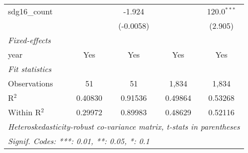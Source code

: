 \begin{tabular}{lcccc}
   sdg16\_count      &                & -1.924         &                & 120.0$^{***}$\\   
                     &                & (-0.0058)      &                & (2.905)\\   
   \midrule
   \emph{Fixed-effects}\\
   year              & Yes            & Yes            & Yes            & Yes\\  
   \midrule
   \emph{Fit statistics}\\
   Observations      & 51             & 51             & 1,834          & 1,834\\  
   R$^2$             & 0.40830        & 0.91536        & 0.49864        & 0.53268\\  
   Within R$^2$      & 0.29972        & 0.89983        & 0.48629        & 0.52116\\  
   \midrule \midrule
   \multicolumn{5}{l}{\emph{Heteroskedasticity-robust co-variance matrix, t-stats in parentheses}}\\
   \multicolumn{5}{l}{\emph{Signif. Codes: ***: 0.01, **: 0.05, *: 0.1}}\\
\end{tabular}
\par\endgroup


